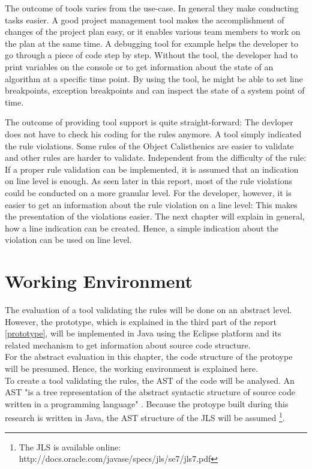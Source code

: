 The outcome of tools varies from the use-case. In general they make conducting tasks easier. A good project management tool makes the accomplishment of changes of the project plan easy, or it enables various team members to work on the plan at the same time. A debugging tool for example helps the developer to go through a piece of code step by step. Without the tool, the developer had to print variables on the console or to get information about the state of an algorithm at a specific time point. By using the tool, he might be able to set line breakpoints, exception breakpoints and can inspect the state of a system point of time. 

The outcome of providing tool support is quite straight-forward: The devloper does not have to check his coding for the rules anymore. A tool simply indicated the rule violations. Some rules of the Object Calisthenics are easier to validate and other rules are harder to validate. Independent from the difficulty of the rule: If a proper rule validation can be implemented, it is assumed that an indication on line level is enough. As seen later in this report, most of the rule violations could be conducted on a more granular level. For the developer, however, it is easier to get an information about the rule violation on a line level: This makes the presentation of the violations easier. The next chapter will explain in general, how a line indication can be created. Hence, a simple indication about the violation can be used on line level. 

\section{Working Environment}
The evaluation of a tool validating the rules will be done on an abstract level. However, the prototype, which is explained in the third part of the report \ref{prototype}, will be implemented in Java using the Eclipse platform and its related mechanism to get information about source code structure. 
\\
For the abstract evaluation in this chapter, the code structure of the protoype will be presumed. Hence, the working environment is explained here. 
\\
To create a tool validating the rules, the \acf{AST} of the code will be analysed. An \acf{AST} "is a tree representation of the abstract syntactic structure of source code written in a programming language" \cite[Abstract Syntax Tree]{wiki}. Because the protoype built during this research is written in Java, the \acf{AST} structure of the \acf{JLS} will be assumed \footnote{The \acf{JLS} is available online: http://docs.oracle.com/javase/specs/jls/se7/jls7.pdf}. 
\\


